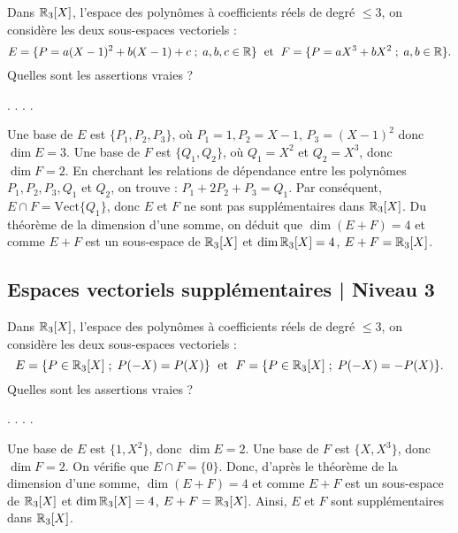 \begin{question}
Dans $\mathbb{R}_3[X]$, l'espace des polynômes  à coefficients réels  de degré $\le 3$, on considère les deux sous-espaces vectoriels  : 
$$E=\{P = a(X-1)^2 +b(X-1)+c\; ;\; a,b,c\in \mathbb{R}\}\;\mbox{ et }\; F= \{P= aX^3 +bX^2\; ; \; a,b \in \mathbb{R}\}.$$
Quelles sont les assertions vraies ?
\begin{answers}  
.
.
.
.
\end{answers}
\begin{explanations} Une base de $E$ est $\{P_1,P_2,P_3\}$, où $P_1=1, P_2=X-1$, $P_3=(X-1)^2$ donc $\dim E=3$.
Une base de $F$ est $\{Q_1,Q_2\}$, où $Q_1=X^2$ et $Q_2=X^3$, donc $\dim F=2$. En cherchant les relations de dépendance 
entre les polynômes $P_1,P_2,P_3, Q_1$ et $Q_2$, on trouve : $P_1+2P_2+P_3= Q_1$. Par conséquent, $E\cap F = \mbox{Vect} \{Q_1\}$, donc  $E$ et $F$ ne sont pas supplémentaires dans $\mathbb{R}_3[X]$. Du théorème de la dimension d'une somme, on déduit que $\dim (E+F) = 4$ et comme $E+F$ est un sous-espace de $\mathbb{R}_3[X]$ et $\dim \mathbb{R}_3[X]=4$, $E+F= \mathbb{R}_3[X]$. 
\end{explanations}
\end{question}

\subsection{Espaces vectoriels supplémentaires | Niveau  3}

\begin{question}
Dans $\mathbb{R}_3[X]$, l'espace des polynômes à coefficients réels de degré $\le 3$, on considère les deux sous-espaces vectoriels : 
$$E=\{P\in \mathbb{R}_3[X]\; ; \; P(-X)=P(X)\}\; \mbox{ et }\; F=\{P\in \mathbb{R}_3[X]\; ; \; P(-X)=-P(X)\}.$$
Quelles sont les assertions vraies ?
\begin{answers}  
.
.
.
.
\end{answers}
\begin{explanations}  Une base de $E$ est $\{1,X^2\}$,  donc $\dim E=2$. Une base de $F$ est $\{X,X^3\}$, donc $\dim F=2$. On vérifie que $E\cap F  =\{0\}$. Donc, d'après le théorème de la dimension d'une somme, $\dim (E+F) = 4$ et comme $E+F$ est un sous-espace de $\mathbb{R}_3[X]$ et $\dim \mathbb{R}_3[X]=4$, $E+F= \mathbb{R}_3[X]$. Ainsi, $E$ et $F$ sont supplémentaires dans $\mathbb{R}_3[X]$.
\end{explanations}
\end{question}

